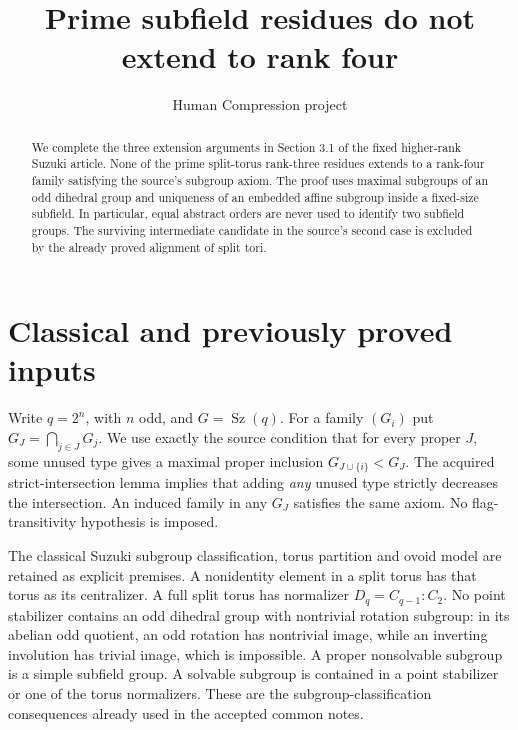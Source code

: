 \documentclass[11pt,a4paper]{article}
\title{Prime subfield residues do not extend to rank four}
\author{Human Compression project}\date{}
\newcommand{\Sz}{\operatorname{Sz}}\newcommand{\gen}[1]{\langle#1\rangle}
\begin{document}
\maketitle
\begin{abstract}
We complete the three extension arguments in Section 3.1 of the fixed
higher-rank Suzuki article. None of the prime split-torus rank-three
residues extends to a rank-four family satisfying the source's subgroup
axiom. The proof uses maximal subgroups of an odd dihedral group and
uniqueness of an embedded affine subgroup inside a fixed-size subfield.
In particular, equal abstract orders are never used to identify two
subfield groups. The surviving intermediate candidate in the source's
second case is excluded by the already proved alignment of split tori.
\end{abstract}

\section{Classical and previously proved inputs}
Write $q=2^n$, with $n$ odd, and $G=\Sz(q)$. For a family
$(G_i)$ put $G_J=\bigcap_{j\in J}G_j$. We use exactly the source
condition that for every proper $J$, some unused type gives a maximal
proper inclusion $G_{J\cup\{i\}}<G_J$.
The acquired strict-intersection lemma implies that adding \emph{any}
unused type strictly decreases the intersection. An induced family in
any $G_J$ satisfies the same axiom. No flag-transitivity hypothesis
is imposed.

The classical Suzuki subgroup classification, torus partition and ovoid
model are retained as explicit premises. A nonidentity element in a
split torus has that torus as its centralizer. A full split torus has
normalizer $D_q=C_{q-1}:C_2$. No point stabilizer contains an odd
dihedral group with nontrivial rotation subgroup: in its abelian odd
quotient, an odd rotation has nontrivial image, while an inverting
involution has trivial image, which is impossible.
A proper nonsolvable subgroup is a simple subfield group. A solvable
subgroup is contained in a point stabilizer or one of the torus
normalizers. These are the subgroup-classification consequences already
used in the accepted common notes.
\end{document}
